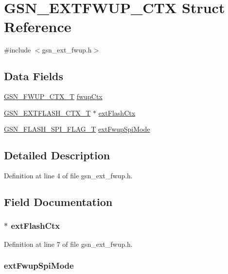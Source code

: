 \hypertarget{a00072}{
\section{GSN\_\-EXTFWUP\_\-CTX Struct Reference}
\label{a00072}
}


{\ttfamily \#include $<$gsn\_\-ext\_\-fwup.h$>$}

\subsection*{Data Fields}
\begin{DoxyCompactItemize}
\item 
\hyperlink{a00082}{GSN\_\-FWUP\_\-CTX\_\-T} \hyperlink{a00072_aa806318462a01e08d5ef5ebe481d2b4a}{fwupCtx}
\item 
\hyperlink{a00071}{GSN\_\-EXTFLASH\_\-CTX\_\-T} $\ast$ \hyperlink{a00072_ad928d7d1bee0e90df0ebde4d89e381e7}{extFlashCtx}
\item 
\hyperlink{a00496_ae69f658e2fd080c54a78eb23e4be2f59}{GSN\_\-FLASH\_\-SPI\_\-FLAG\_\-T} \hyperlink{a00072_a351bf0c2faf112c0e45d5e8f81f52803}{extFwupSpiMode}
\end{DoxyCompactItemize}


\subsection{Detailed Description}


Definition at line 4 of file gsn\_\-ext\_\-fwup.h.



\subsection{Field Documentation}
\hypertarget{a00072_ad928d7d1bee0e90df0ebde4d89e381e7}{
\subsubsection[{extFlashCtx}]{$\ast$ {\bf extFlashCtx}}}
\label{a00072_ad928d7d1bee0e90df0ebde4d89e381e7}


Definition at line 7 of file gsn\_\-ext\_\-fwup.h.

\hypertarget{a00072_a351bf0c2faf112c0e45d5e8f81f52803}{
\subsubsection[{extFwupSpiMode}]{ {\bf extFwupSpiMode}}}
\label{a00072_a351bf0c2faf112c0e45d5e8f81f52803}


